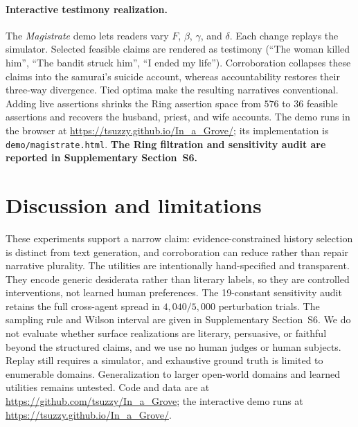\documentclass{article}
\begin{document}
\paragraph{Interactive testimony realization.} The \emph{Magistrate} demo lets readers vary $F$, $\beta$, $\gamma$, and $\delta$. Each change replays the simulator. Selected feasible claims are rendered as testimony (``The woman killed him'', ``The bandit struck him'', ``I ended my life''). Corroboration collapses these claims into the samurai's suicide account, whereas accountability restores their three-way divergence. Tied optima make the resulting narratives conventional. Adding live assertions shrinks the Ring assertion space from $576$ to $36$ feasible assertions and recovers the husband, priest, and wife accounts. The demo runs in the browser at \url{https://tsuzzy.github.io/In_a_Grove/}; its implementation is \texttt{demo/magistrate.html}. \textbf{The Ring filtration and sensitivity audit are reported in Supplementary Section~S6.}

\section{Discussion and limitations}
\label{sec:limitations}

These experiments support a narrow claim: evidence-constrained history selection is distinct from text generation, and corroboration can reduce rather than repair narrative plurality. The utilities are intentionally hand-specified and transparent. They encode generic desiderata rather than literary labels, so they are controlled interventions, not learned human preferences. The 19-constant sensitivity audit retains the full cross-agent spread in $4{,}040/5{,}000$ perturbation trials. The sampling rule and Wilson interval are given in Supplementary Section~S6. We do not evaluate whether surface realizations are literary, persuasive, or faithful beyond the structured claims, and we use no human judges or human subjects. Replay still requires a simulator, and exhaustive ground truth is limited to enumerable domains. Generalization to larger open-world domains and learned utilities remains untested. Code and data are at \url{https://github.com/tsuzzy/In_a_Grove}; the interactive demo runs at \url{https://tsuzzy.github.io/In_a_Grove/}.

{\footnotesize

\scriptsize

}
\end{document}
